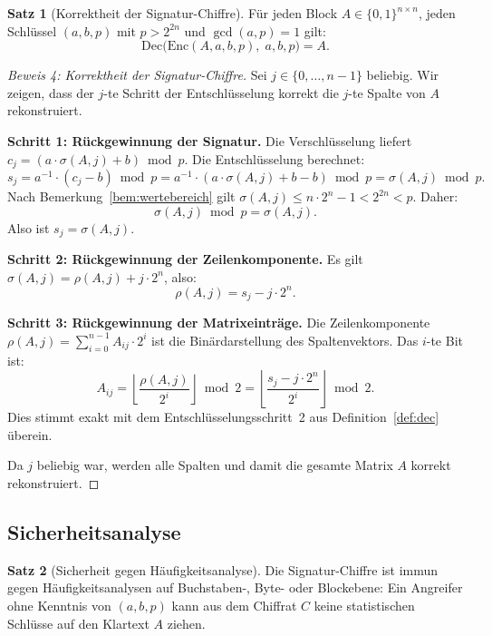 ﻿\documentclass[a4paper,12pt]{scrreprt}
\theoremstyle{definition}
\newtheorem{satz}{Satz}[section]
\begin{document}
\begin{satz}[Korrektheit der Signatur-Chiffre]
	\label{satz:korrektheit}
	Für jeden Block $A \in \{0,1\}^{n \times n}$, jeden Schlüssel $(a,b,p)$ mit $p > 2^{2n}$ und $\gcd(a,p)=1$ gilt:
	\[
	\mathrm{Dec}\bigl(\mathrm{Enc}(A, a, b, p),\; a, b, p\bigr) = A.
	\]
\end{satz}

\begin{proof}[Beweis 4: Korrektheit der Signatur-Chiffre]
	Sei $j \in \{0,\ldots,n-1\}$ beliebig. Wir zeigen, dass der $j$-te Schritt der Entschlüsselung korrekt die $j$-te Spalte von $A$ rekonstruiert.
	
	\textbf{Schritt 1: Rückgewinnung der Signatur.}
	Die Verschlüsselung liefert $c_j = (a \cdot \sigma(A,j) + b) \bmod p$. Die Entschlüsselung berechnet:
	\[
	s_j = a^{-1} \cdot (c_j - b) \bmod p = a^{-1} \cdot (a \cdot \sigma(A,j) + b - b) \bmod p = \sigma(A,j) \bmod p.
	\]
	Nach Bemerkung~\ref{bem:wertebereich} gilt $\sigma(A,j) \leq n \cdot 2^n - 1 < 2^{2n} < p$. Daher:
	\[
	\sigma(A,j) \bmod p = \sigma(A,j).
	\]
	Also ist $s_j = \sigma(A,j)$.
	
	\textbf{Schritt 2: Rückgewinnung der Zeilenkomponente.}
	Es gilt $\sigma(A,j) = \rho(A,j) + j \cdot 2^n$, also:
	\[
	\rho(A,j) = s_j - j \cdot 2^n.
	\]
	
	\textbf{Schritt 3: Rückgewinnung der Matrixeinträge.}
	Die Zeilenkomponente $\rho(A,j) = \sum_{i=0}^{n-1} A_{ij} \cdot 2^i$ ist die Binärdarstellung des Spaltenvektors. Das $i$-te Bit ist:
	\[
	A_{ij} = \left\lfloor \frac{\rho(A,j)}{2^i} \right\rfloor \bmod 2 = \left\lfloor \frac{s_j - j \cdot 2^n}{2^i} \right\rfloor \bmod 2.
	\]
	Dies stimmt exakt mit dem Entschlüsselungsschritt~2 aus Definition~\ref{def:dec} überein.
	
	Da $j$ beliebig war, werden alle Spalten und damit die gesamte Matrix $A$ korrekt rekonstruiert.
\end{proof}

\subsection{Sicherheitsanalyse}

\begin{satz}[Sicherheit gegen Häufigkeitsanalyse]
	\label{satz:haeufigkeit}
	Die Signatur-Chiffre ist immun gegen Häufigkeitsanalysen auf Buchstaben-, Byte- oder Blockebene: Ein Angreifer ohne Kenntnis von $(a, b, p)$ kann aus dem Chiffrat $C$ keine statistischen Schlüsse auf den Klartext $A$ ziehen.
\end{satz}
\end{document}
